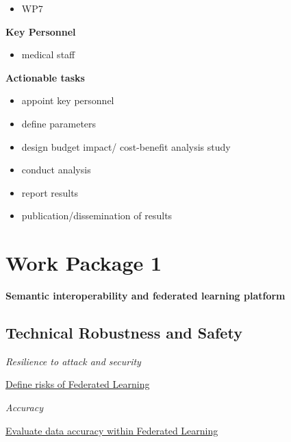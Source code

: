 \documentclass[
  letterpaper,
  DIV=11,
  numbers=noendperiod]{scrreport}
\providecommand{\tightlist}{%
  \setlength{\itemsep}{0pt}\setlength{\parskip}{0pt}}\usepackage{longtable,booktabs,array}
\begin{document}
\begin{itemize}
\tightlist
\item
  WP7
\end{itemize}

\textbf{Key Personnel}

\begin{itemize}
\tightlist
\item
  medical staff
\end{itemize}

\textbf{Actionable tasks}

\begin{itemize}
\tightlist
\item
  appoint key personnel
\item
  define parameters
\item
  design budget impact/ cost-benefit analysis study
\item
  conduct analysis
\item
  report results
\item
  publication/dissemination of results
\end{itemize}


\hypertarget{work-package-1}{%
\chapter*{Work Package 1}\label{work-package-1}}


\textbf{Semantic interoperability and federated learning platform}

\hypertarget{technical-robustness-and-safety-1}{%
\section*{Technical Robustness and
Safety}\label{technical-robustness-and-safety-1}}


\emph{Resilience to attack and security}

\protect\hyperlink{define-risks-of-federated-learning}{Define risks of
Federated Learning}

\emph{Accuracy}

\protect\hyperlink{evaluate-data-accuracy-within-federated-learning}{Evaluate
data accuracy within Federated Learning}
\end{document}
